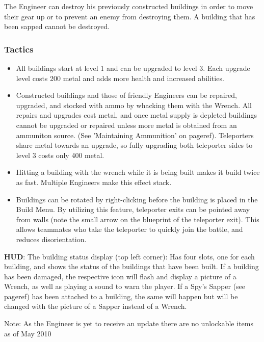  The Engineer can destroy his previously constructed buildings in order to move their gear up or to prevent an enemy from destroying them. A building that has been sapped cannot be destroyed.


\subsubsection {Tactics}
\begin {itemize}

\item All buildings start at level 1 and can be upgraded to level 3.  Each upgrade level costs 200 metal and adds more health and increased abilities.

\item Constructed buildings and those of friendly Engineers can be repaired, upgraded, and stocked with ammo by whacking them with the Wrench.  All repairs and upgrades cost metal, and once metal supply is depleted buildings cannot be upgraded or repaired unless more metal is obtained from an ammuniton source.  (See 'Maintaining Ammunition' on {{pageref}}). Teleporters share metal towards an upgrade, so fully upgrading both teleporter sides to level 3 costs only 400 metal.

\item Hitting a building with the wrench while it is being built makes it build twice as fast.  Multiple Engineers make this effect stack.

\item Buildings can be rotated by right-clicking before the building is placed in the Build Menu. By utilizing this feature,  teleporter exits can be pointed away from walls (note the small arrow on the blueprint of the teleporter exit). This allows teammates who take the teleporter to quickly join the battle, and reduces disorientation.
\end {itemize}
{\bf HUD}:
The building status display (top left corner): Has four slots, one for each building, and shows the status of the buildings that have been built. If a building has been damaged, the respective icon will  flash and display a picture of a Wrench, as well as playing a sound to warn the player. If a Spy's Sapper (see {{pageref}}) has been attached to a building, the same will happen but will be changed with the picture of a Sapper instead of a Wrench.
 
Note: As the Engineer is yet to receive an update there are no unlockable items as of May 2010 
 